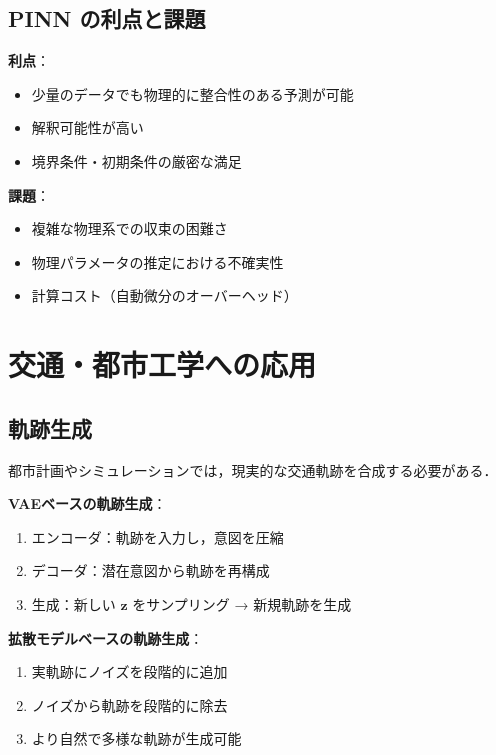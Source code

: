 \subsection{PINN の利点と課題}

\textbf{利点}：
\begin{itemize}
  \item 少量のデータでも物理的に整合性のある予測が可能
  \item 解釈可能性が高い
  \item 境界条件・初期条件の厳密な満足
\end{itemize}

\textbf{課題}：
\begin{itemize}
  \item 複雑な物理系での収束の困難さ
  \item 物理パラメータの推定における不確実性
  \item 計算コスト（自動微分のオーバーヘッド）
\end{itemize}

\section{交通・都市工学への応用}
\label{sec:generative-traffic}

\subsection{軌跡生成}

都市計画やシミュレーションでは，現実的な交通軌跡を合成する必要がある．

\textbf{VAEベースの軌跡生成}：
\begin{enumerate}
  \item エンコーダ：軌跡を入力し，意図を圧縮
  \item デコーダ：潜在意図から軌跡を再構成
  \item 生成：新しい $\boldsymbol{z}$ をサンプリング → 新規軌跡を生成
\end{enumerate}

\textbf{拡散モデルベースの軌跡生成}：
\begin{enumerate}
  \item 実軌跡にノイズを段階的に追加
  \item ノイズから軌跡を段階的に除去
  \item より自然で多様な軌跡が生成可能
\end{enumerate}

